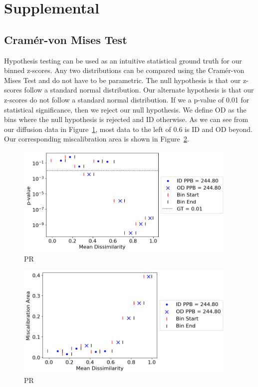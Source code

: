 \section{Supplemental}

\subsection{Cram\'er-von Mises Test}

\par Hypothesis testing can be used as an intuitive statistical ground truth for our binned z-scores. Any two distributions can be compared using the Cram\'er-von Mises Test and do not have to be parametric. The null hypothesis is that our z-scores follow a standard normal distribution. Our alternate hypothesis is that our z-scores do not follow a standard normal distribution. If we a p-value of 0.01 for statistical significance, then we reject our null hypothesis. We define OD as the bins where the null hypothesis is rejected and ID otherwise. As we can see from our diffusion data in Figure~\ref{p_values_small}, most data to the left of 0.6 is ID and OD beyond. Our corresponding miscalibration area is shown in Figure~\ref{area_small}.

\begin{figure}[H]
\centering
\includegraphics[width=0.95\textwidth]{figures/p_values_small.png}
\caption{PR}
\label{p_values_small}
\end{figure}

\begin{figure}[H]
\centering
\includegraphics[width=0.95\textwidth]{figures/area_small.png}
\caption{PR}
\label{area_small}
\end{figure}

